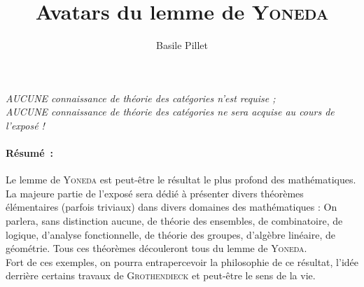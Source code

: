 \documentclass[10pt,a4paper]{article}
\author{Basile Pillet}
\title{Avatars du lemme de \textsc{Yoneda}}
\date{}
\begin{document}
\maketitle
\begin{center}
\textit{AUCUNE connaissance de théorie des catégories n'est requise ;\\AUCUNE connaissance de théorie des catégories ne sera acquise au cours de l'exposé !}
\end{center}
\paragraph{Résumé~:}
Le lemme de \textsc{Yoneda} est peut-être le résultat le plus profond des mathématiques. La majeure partie de l'exposé sera dédié à présenter divers théorèmes élémentaires (parfois triviaux) dans divers domaines des mathématiques : On parlera, sans distinction aucune, de théorie des ensembles, de combinatoire, de logique, d'analyse fonctionnelle, de théorie des groupes, d'algèbre linéaire, de géométrie. Tous ces théorèmes découleront tous du lemme de \textsc{Yoneda}.\\
Fort de ces exemples, on pourra entrapercevoir la philosophie de ce résultat, l'idée derrière certains travaux de \textsc{Grothendieck} et peut-être le sens de la vie.
\end{document}
